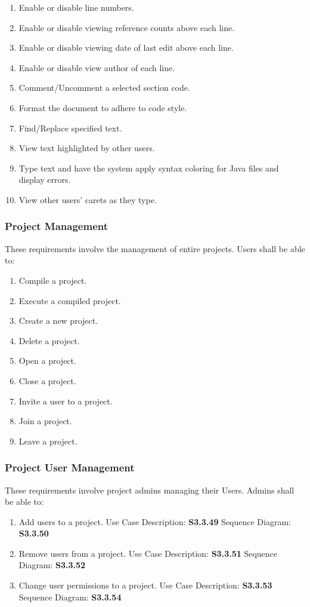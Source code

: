 \documentclass[twoside,letterpaper]{article}
\begin{document}
{\begin{enumerate}
	\item Enable or disable line numbers.
	\item Enable or disable viewing reference counts above each line.
	\item Enable or disable viewing date of last edit above each line.
	\item Enable or disable view author of each line.
	\item Comment/Uncomment a selected section code.
	\item Format the document to adhere to code style.
	\item Find/Replace specified text.
	\item View text highlighted by other users.
	\item Type text and have the system apply syntax coloring for Java files and display errors.
	\item View other users' carets as they type.
\end{enumerate}

\subsubsection{Project Management}

These requirements involve the management of entire projects. Users shall be able to:

\begin{enumerate}
	\item Compile a project.
	\item Execute a compiled project.
	\item Create a new project.
	\item Delete a project.
	\item Open a project.
	\item Close a project.
	\item Invite a user to a project.
	\item Join a project.
	\item Leave a project.
\end{enumerate}

\subsubsection{Project User Management}

These requirements involve project admins managing their Users. Admins shall be able to:

\begin{enumerate}
	\item Add users to a project.
    \subitem Use Case Description: \textbf{S3.3.49}
		\subitem Sequence Diagram: \textbf{S3.3.50}
  \item Remove users from a project.
    \subitem Use Case Description: \textbf{S3.3.51}
		\subitem Sequence Diagram: \textbf{S3.3.52}
	\item Change user permissions to a project.
    \subitem Use Case Description: \textbf{S3.3.53}
		\subitem Sequence Diagram: \textbf{S3.3.54}
\end{enumerate}

}
\end{document}
